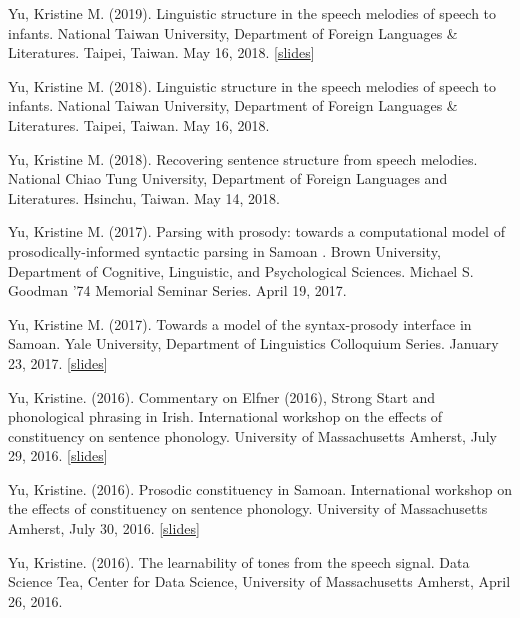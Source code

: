 \documentclass[10pt]{article}
\begin{document}
\begin{bibenum}
  
\item Yu, Kristine M. (2019). Linguistic structure in the speech melodies of speech to infants. National Taiwan University, Department of Foreign Languages \& Literatures. Taipei, Taiwan. May 16, 2018. [\href{https://speakerdeck.com/krisyu/towards-a-model-of-the-samoan-syntax-prosody-interface}{slides}]

  
\item Yu, Kristine M. (2018). Linguistic structure in the speech melodies of speech to infants. National Taiwan University, Department of Foreign Languages \& Literatures. Taipei, Taiwan. May 16, 2018. 
  
\item Yu, Kristine M. (2018). Recovering sentence structure from speech melodies. National Chiao Tung University, Department of Foreign Languages and Literatures. Hsinchu, Taiwan. May 14, 2018.
  
\item Yu, Kristine M. (2017). Parsing with prosody: towards a computational model of prosodically-informed syntactic parsing in Samoan
. Brown University, Department of
  Cognitive, Linguistic, and Psychological Sciences. Michael S. Goodman '74 Memorial Seminar Series. April 19, 2017.  
\item Yu, Kristine M. (2017). Towards a model of the syntax-prosody interface in Samoan. Yale University, Department of
  Linguistics Colloquium Series. January 23, 2017. [\href{https://speakerdeck.com/krisyu/towards-a-model-of-the-samoan-syntax-prosody-interface}{slides}]
  \item Yu, Kristine. (2016). Commentary on Elfner (2016), Strong
    Start and phonological phrasing in Irish. International workshop on the effects of
    constituency on sentence phonology. University of Massachusetts
    Amherst, July 29, 2016. [\href{https://speakerdeck.com/krisyu/commentary-on-elfners-strong-start-and-phonological-phrasing-in-irish}{slides}]

  \item Yu, Kristine. (2016). Prosodic constituency in Samoan. International workshop on the effects of
    constituency on sentence phonology. University of Massachusetts
    Amherst, July 30, 2016. [\href{https://speakerdeck.com/krisyu/prosodic-constituency-in-samoan}{slides}]

  \item Yu, Kristine. (2016). The learnability of tones from the
    speech signal. Data Science Tea, Center for Data
    Science, University of Massachusetts Amherst, April 26, 2016.


\end{bibenum}
\end{document}
